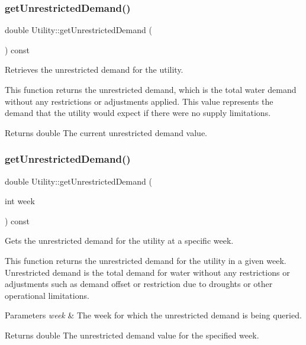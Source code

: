 \subsubsection{\texorpdfstring{get\+Unrestricted\+Demand()}{getUnrestrictedDemand()}\hspace{0.1cm}{\footnotesize\ttfamily [1/2]}}
{\footnotesize\ttfamily double Utility\+::get\+Unrestricted\+Demand (\begin{DoxyParamCaption}{ }\end{DoxyParamCaption}) const}



Retrieves the unrestricted demand for the utility. 

This function returns the unrestricted demand, which is the total water demand without any restrictions or adjustments applied. This value represents the demand that the utility would expect if there were no supply limitations.

\begin{DoxyReturn}{Returns}
double The current unrestricted demand value. 
\end{DoxyReturn}
\mbox{\label{classUtility_ae2d1b744d965d9b916dd7d3103631c92}} 
\subsubsection{\texorpdfstring{get\+Unrestricted\+Demand()}{getUnrestrictedDemand()}\hspace{0.1cm}{\footnotesize\ttfamily [2/2]}}
{\footnotesize\ttfamily double Utility\+::get\+Unrestricted\+Demand (\begin{DoxyParamCaption}\item[{int}]{week }\end{DoxyParamCaption}) const}



Gets the unrestricted demand for the utility at a specific week. 

This function returns the unrestricted demand for the utility in a given week. Unrestricted demand is the total demand for water without any restrictions or adjustments such as demand offset or restriction due to droughts or other operational limitations.


\begin{DoxyParams}{Parameters}
{\em week} & The week for which the unrestricted demand is being queried.\\
\hline
\end{DoxyParams}
\begin{DoxyReturn}{Returns}
double The unrestricted demand value for the specified week.
\end{DoxyReturn}

